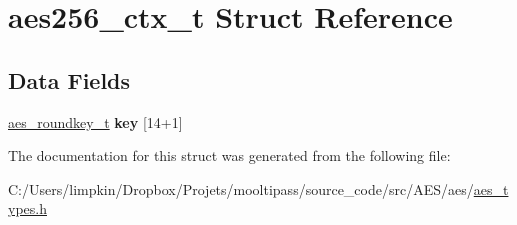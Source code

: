 \hypertarget{structaes256__ctx__t}{\section{aes256\+\_\+ctx\+\_\+t Struct Reference}
\label{structaes256__ctx__t}
}
\subsection*{Data Fields}
\begin{DoxyCompactItemize}
\item 
\hypertarget{structaes256__ctx__t_aac9ff4933a314ba93b4bec6e92199d17}{\hyperlink{structaes__roundkey__t}{aes\+\_\+roundkey\+\_\+t} {\bfseries key} \mbox{[}14+1\mbox{]}}\label{structaes256__ctx__t_aac9ff4933a314ba93b4bec6e92199d17}

\end{DoxyCompactItemize}


The documentation for this struct was generated from the following file\+:\begin{DoxyCompactItemize}
\item 
C\+:/\+Users/limpkin/\+Dropbox/\+Projets/mooltipass/source\+\_\+code/src/\+A\+E\+S/aes/\hyperlink{aes__types_8h}{aes\+\_\+types.\+h}\end{DoxyCompactItemize}
